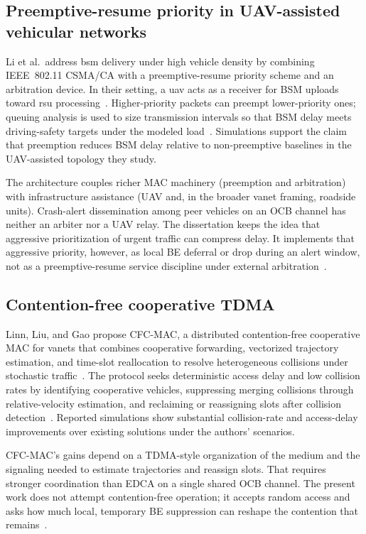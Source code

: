 \subsection{Preemptive-resume priority in UAV-assisted vehicular networks}
\label{sec:rw:prp}

Li et al.\ address \gls{bsm} delivery under high vehicle density by combining IEEE~802.11 CSMA/CA with a preemptive-resume priority scheme and an arbitration device.
In their setting, a \gls{uav} acts as a receiver for BSM uploads toward \gls{rsu} processing~\cite{PRP_MAC_Li}.
Higher-priority packets can preempt lower-priority ones; queuing analysis is used to size transmission intervals so that BSM delay meets driving-safety targets under the modeled load~\cite{PRP_MAC_Li}.
Simulations support the claim that preemption reduces BSM delay relative to non-preemptive baselines in the UAV-assisted topology they study.

The architecture couples richer MAC machinery (preemption and arbitration) with infrastructure assistance (UAV and, in the broader \gls{vanet} framing, roadside units).
Crash-alert dissemination among peer vehicles on an OCB channel has neither an arbiter nor a UAV relay.
The dissertation keeps the idea that aggressive prioritization of urgent traffic can compress delay.
It implements that aggressive priority, however, as local BE deferral or drop during an alert window, not as a preemptive-resume service discipline under external arbitration~\cite{PRP_MAC_Li}.

\subsection{Contention-free cooperative TDMA}
\label{sec:rw:cfc}

Linn, Liu, and Gao propose CFC-MAC, a distributed contention-free cooperative MAC for \glspl{vanet} that combines cooperative forwarding, vectorized trajectory estimation, and time-slot reallocation to resolve heterogeneous collisions under stochastic traffic~\cite{CFC_MAC_Linn}.
The protocol seeks deterministic access delay and low collision rates by identifying cooperative vehicles, suppressing merging collisions through relative-velocity estimation, and reclaiming or reassigning slots after collision detection~\cite{CFC_MAC_Linn}.
Reported simulations show substantial collision-rate and access-delay improvements over existing solutions under the authors' scenarios.

CFC-MAC's gains depend on a TDMA-style organization of the medium and the signaling needed to estimate trajectories and reassign slots.
That requires stronger coordination than EDCA on a single shared OCB channel.
The present work does not attempt contention-free operation; it accepts random access and asks how much local, temporary BE suppression can reshape the contention that remains~\cite{CFC_MAC_Linn,IEEE80211}.

